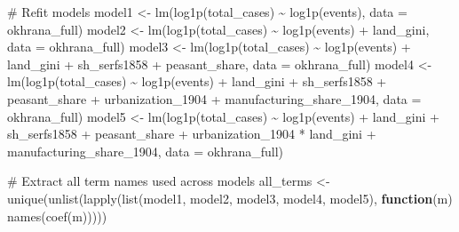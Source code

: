\documentclass[
  11pt,
  letterpaper,
  DIV=11,
  numbers=noendperiod]{scrartcl}
\newenvironment{Shaded}{\begin{snugshade}}{\end{snugshade}}
\newcommand{\AttributeTok}[1]{\textcolor[rgb]{0.16,0.50,0.73}{#1}}
\newcommand{\CommentTok}[1]{\textcolor[rgb]{0.48,0.49,0.49}{#1}}
\newcommand{\ControlFlowTok}[1]{\textcolor[rgb]{0.99,0.74,0.29}{\textbf{#1}}}
\newcommand{\FunctionTok}[1]{\textcolor[rgb]{0.56,0.27,0.68}{#1}}
\newcommand{\NormalTok}[1]{\textcolor[rgb]{0.81,0.81,0.76}{#1}}
\newcommand{\OtherTok}[1]{\textcolor[rgb]{0.15,0.68,0.38}{#1}}
\newcommand{\SpecialCharTok}[1]{\textcolor[rgb]{0.24,0.68,0.91}{#1}}
\begin{document}
\begin{Shaded}
\begin{Highlighting}[]
\CommentTok{\# Refit models}
\NormalTok{model1 }\OtherTok{\textless{}{-}} \FunctionTok{lm}\NormalTok{(}\FunctionTok{log1p}\NormalTok{(total\_cases) }\SpecialCharTok{\textasciitilde{}} \FunctionTok{log1p}\NormalTok{(events), }\AttributeTok{data =}\NormalTok{ okhrana\_full)}
\NormalTok{model2 }\OtherTok{\textless{}{-}} \FunctionTok{lm}\NormalTok{(}\FunctionTok{log1p}\NormalTok{(total\_cases) }\SpecialCharTok{\textasciitilde{}} \FunctionTok{log1p}\NormalTok{(events) }\SpecialCharTok{+}\NormalTok{ land\_gini, }\AttributeTok{data =}\NormalTok{ okhrana\_full)}
\NormalTok{model3 }\OtherTok{\textless{}{-}} \FunctionTok{lm}\NormalTok{(}\FunctionTok{log1p}\NormalTok{(total\_cases) }\SpecialCharTok{\textasciitilde{}} \FunctionTok{log1p}\NormalTok{(events) }\SpecialCharTok{+}\NormalTok{ land\_gini }\SpecialCharTok{+}\NormalTok{ sh\_serfs1858 }\SpecialCharTok{+}\NormalTok{ peasant\_share, }\AttributeTok{data =}\NormalTok{ okhrana\_full)}
\NormalTok{model4 }\OtherTok{\textless{}{-}} \FunctionTok{lm}\NormalTok{(}\FunctionTok{log1p}\NormalTok{(total\_cases) }\SpecialCharTok{\textasciitilde{}} \FunctionTok{log1p}\NormalTok{(events) }\SpecialCharTok{+}\NormalTok{ land\_gini }\SpecialCharTok{+}\NormalTok{ sh\_serfs1858 }\SpecialCharTok{+}\NormalTok{ peasant\_share }\SpecialCharTok{+}
\NormalTok{               urbanization\_1904 }\SpecialCharTok{+}\NormalTok{ manufacturing\_share\_1904, }\AttributeTok{data =}\NormalTok{ okhrana\_full)}
\NormalTok{model5 }\OtherTok{\textless{}{-}} \FunctionTok{lm}\NormalTok{(}\FunctionTok{log1p}\NormalTok{(total\_cases) }\SpecialCharTok{\textasciitilde{}} \FunctionTok{log1p}\NormalTok{(events) }\SpecialCharTok{+}\NormalTok{ land\_gini }\SpecialCharTok{+}\NormalTok{ sh\_serfs1858 }\SpecialCharTok{+}\NormalTok{ peasant\_share }\SpecialCharTok{+}
\NormalTok{               urbanization\_1904 }\SpecialCharTok{*}\NormalTok{ land\_gini }\SpecialCharTok{+}\NormalTok{ manufacturing\_share\_1904, }\AttributeTok{data =}\NormalTok{ okhrana\_full)}

\CommentTok{\# Extract all term names used across models}
\NormalTok{all\_terms }\OtherTok{\textless{}{-}} \FunctionTok{unique}\NormalTok{(}\FunctionTok{unlist}\NormalTok{(}\FunctionTok{lapply}\NormalTok{(}\FunctionTok{list}\NormalTok{(model1, model2, model3, model4, model5), }\ControlFlowTok{function}\NormalTok{(m) }\FunctionTok{names}\NormalTok{(}\FunctionTok{coef}\NormalTok{(m)))))}


\end{Highlighting}
\end{Shaded}
\end{document}
